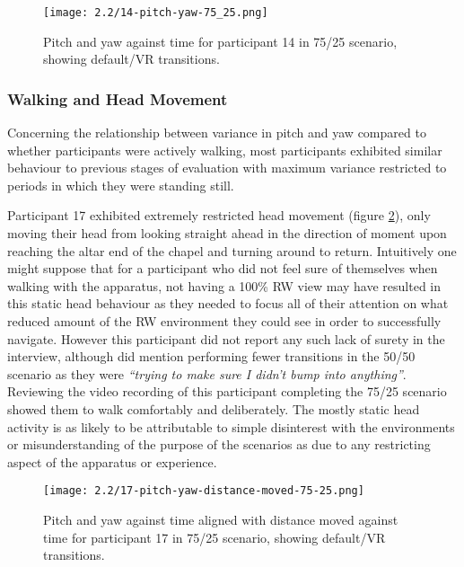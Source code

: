 \begin{figure}[h]
	\begin{center}
	\texttt{[image: 2.2/14-pitch-yaw-75\_25.png]}
	\caption{Pitch and yaw against time for participant 14 in 75/25 scenario, showing default/VR transitions.}
	\label{14-pitch-yaw-75_25.png}
	\end{center}
\end{figure}


\subsubsection{Walking and Head Movement}

Concerning the relationship between variance in pitch and yaw compared to whether participants were actively walking, most participants exhibited similar behaviour to previous stages of evaluation with maximum variance restricted to periods in which they were standing still.

Participant 17 exhibited extremely restricted head movement (figure \ref{17-pitch-yaw-distance-moved-75-25.png}), only moving their head from looking straight ahead in the direction of moment upon reaching the altar end of the chapel and turning around to return. Intuitively one might suppose that for a participant who did not feel sure of themselves when walking with the apparatus, not having a 100\% RW view may have resulted in this static head behaviour as they needed to focus all of their attention on what reduced amount of the RW environment they could see in order to successfully navigate. However this participant did not report any such lack of surety in the interview, although did mention performing fewer transitions in the 50/50 scenario as they were \textit{``trying to make sure I didn't bump into anything''}. Reviewing the video recording of this participant completing the 75/25 scenario showed them to walk comfortably and deliberately. The mostly static head activity is as likely to be attributable to simple disinterest with the environments or misunderstanding of the purpose of the scenarios as due to any restricting aspect of the apparatus or experience.

\begin{figure}[h]
	\begin{center}
	\texttt{[image: 2.2/17-pitch-yaw-distance-moved-75-25.png]}
	\caption{Pitch and yaw against time aligned with distance moved against time for participant 17 in 75/25 scenario, showing default/VR transitions.}
	\label{17-pitch-yaw-distance-moved-75-25.png}
	\end{center}
\end{figure}

